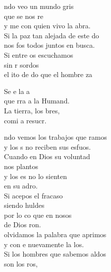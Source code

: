\begin{cancion}%
	ndo veo un mundo gris \\
	que se nos re\\
	y me  con quien vivo la abra.\\
	Si la paz tan alejada de este do\\
	nos fos todos juntos en busca.\\
	Si entre os escuchamos \\
	sin r sordos\\
	el ito de do que el hombre za\\
	\begin{chorus}%
	Se e la a\\
	que rra a la Humand.\\
	La tierra, los bres,\\
	comi a resucr.\\
	\end{chorus}%
	ndo vemos los trabajos que ramos\\
	y los s no reciben sus esfuos.\\
	Cuando en Dios su voluntad \\
	nos plantos\\
	y los es no lo sienten \\
	en su adro.\\
	Si acepos el fracaso \\
	siendo huldes\\
	por lo co que en nosos \\
	de Dios ron.\\
	olvidamos la palabra que aprimos\\
	y con e nuevamente la los.\\
	Si los hombres que sabemos aldos\\
	son los ros, \\

\end{cancion}
